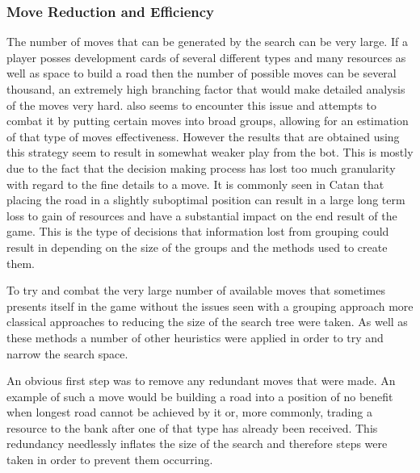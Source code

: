 \documentclass[]{article}
\begin{document}
\subsubsection{Move Reduction and Efficiency}
The number of moves that can be generated by the search can be very large. If a player posses development cards of several different types and many resources as well as space to build a road then the number of possible moves can be several thousand, an extremely high branching factor that would make detailed analysis of the moves very hard. \textcite{roelofs2012monte} also seems to encounter this issue and attempts to combat it by putting certain moves into broad groups, allowing for an estimation of that type of moves effectiveness. However the results that are obtained using this strategy seem to result in somewhat weaker play from the bot. This is mostly due to the fact that the decision making process has lost too much granularity with regard to the fine details to a move. It is commonly seen in Catan that placing the road in a slightly suboptimal position can result in a large long term loss to gain of resources and have a substantial impact on the end result of the game. This is the type of decisions that information lost from grouping could result in depending on the size of the groups and the methods used to create them.

\par To try and combat the very large number of available moves that sometimes presents itself in the game without the issues seen with a grouping approach more classical approaches to reducing the size of the search tree were taken. As well as these methods a number of other heuristics were applied in order to try and narrow the search space.

\par An obvious first step was to remove any redundant moves that were made. An example of such a move would be building a road into a position of no benefit when longest road cannot be achieved by it or, more commonly, trading a resource to the bank after one of that type has already been received. This redundancy needlessly inflates the size of the search and therefore steps were taken in order to prevent them occurring.
\end{document}
